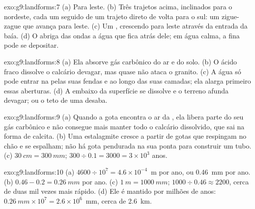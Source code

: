 \begin{solution}{exo:g9:landforms:7}
(a) Para leste. (b) Três trajetos  acima, inclinados para o
nordeste, cada um seguido de um trajeto direto de volta para o sul: um
zigue-zague que avança para leste. (c) Um , crescendo para leste
através da entrada da baía. (d) O  abriga das ondas a água que fica
atrás dele; em água calma, a  fina pode se depositar.
\end{solution}

\begin{solution}{exo:g9:landforms:8}
(a) Ela absorve gás carbônico do ar e do solo. (b) O ácido fraco dissolve
o calcário devagar, mas quase não ataca o granito. (c) A água só pode
entrar na  pelas suas fendas e ao longo das suas camadas; ela alarga
primeiro essas aberturas. (d) A  embaixo da superfície se dissolve e
o terreno afunda devagar; ou o teto de uma  desaba.
\end{solution}

\begin{solution}{exo:g9:landforms:9}
(a) Quando a gota encontra o ar da , ela libera parte do seu gás
carbônico e não consegue mais manter todo o calcário dissolvido, que sai
na forma de calcita. (b) Uma estalagmite cresce a partir de gotas que
respingam no chão e se espalham; não há gota pendurada na sua ponta para
construir um tubo.
(c) $\qty{30}{cm} = \qty{300}{mm}$; $300 \div 0.1 = 3000 = 3 \times 10^3$
anos.
\end{solution}

\begin{solution}{exo:g9:landforms:10}
(a) $4600 \div 10^7 = 4.6 \times 10^{-4}$~m por ano, ou \qty{0.46}{mm}
por ano. (b) $0.46 - 0.2 = \qty{0.26}{mm}$ por ano. (c) $\qty{1}{m} =
\qty{1000}{mm}$; $1000 \div 0.46 \approx 2200$, cerca de duas mil vezes
mais rápido. (d) Ele é mantido por milhões de anos: $\qty{0.26}{mm} \times
10^7 = 2.6 \times 10^6$~mm, cerca de \qty{2.6}{km}.
\end{solution}

